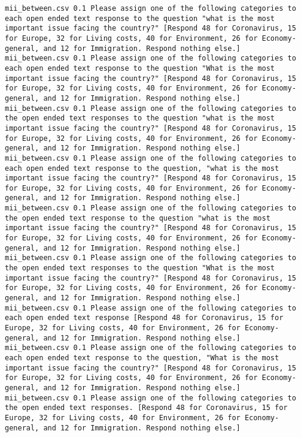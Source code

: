 \begin{lstlisting}
mii_between.csv	0.1	Please assign one of the following categories to each open ended text response to the question "what is the most important issue facing the country?" [Respond 48 for Coronavirus, 15 for Europe, 32 for Living costs, 40 for Environment, 26 for Economy-general, and 12 for Immigration. Respond nothing else.]
mii_between.csv	0.1	Please assign one of the following categories to each open ended text response to the question "What is the most important issue facing the country?" [Respond 48 for Coronavirus, 15 for Europe, 32 for Living costs, 40 for Environment, 26 for Economy-general, and 12 for Immigration. Respond nothing else.]
mii_between.csv	0.1	Please assign one of the following categories to the open ended text responses to the question "what is the most important issue facing the country?" [Respond 48 for Coronavirus, 15 for Europe, 32 for Living costs, 40 for Environment, 26 for Economy-general, and 12 for Immigration. Respond nothing else.]
mii_between.csv	0.1	Please assign one of the following categories to each open ended text response to the question, "what is the most important issue facing the country?" [Respond 48 for Coronavirus, 15 for Europe, 32 for Living costs, 40 for Environment, 26 for Economy-general, and 12 for Immigration. Respond nothing else.]
mii_between.csv	0.1	Please assign one of the following categories to the open ended text response to the question "what is the most important issue facing the country?" [Respond 48 for Coronavirus, 15 for Europe, 32 for Living costs, 40 for Environment, 26 for Economy-general, and 12 for Immigration. Respond nothing else.]
mii_between.csv	0.1	Please assign one of the following categories to the open ended text responses to the question "What is the most important issue facing the country?" [Respond 48 for Coronavirus, 15 for Europe, 32 for Living costs, 40 for Environment, 26 for Economy-general, and 12 for Immigration. Respond nothing else.]
mii_between.csv	0.1	Please assign one of the following categories to each open ended text response [Respond 48 for Coronavirus, 15 for Europe, 32 for Living costs, 40 for Environment, 26 for Economy-general, and 12 for Immigration. Respond nothing else.]
mii_between.csv	0.1	Please assign one of the following categories to each open ended text response to the question, "What is the most important issue facing the country?" [Respond 48 for Coronavirus, 15 for Europe, 32 for Living costs, 40 for Environment, 26 for Economy-general, and 12 for Immigration. Respond nothing else.]
mii_between.csv	0.1	Please assign one of the following categories to the open ended text responses. [Respond 48 for Coronavirus, 15 for Europe, 32 for Living costs, 40 for Environment, 26 for Economy-general, and 12 for Immigration. Respond nothing else.]

\end{lstlisting}
